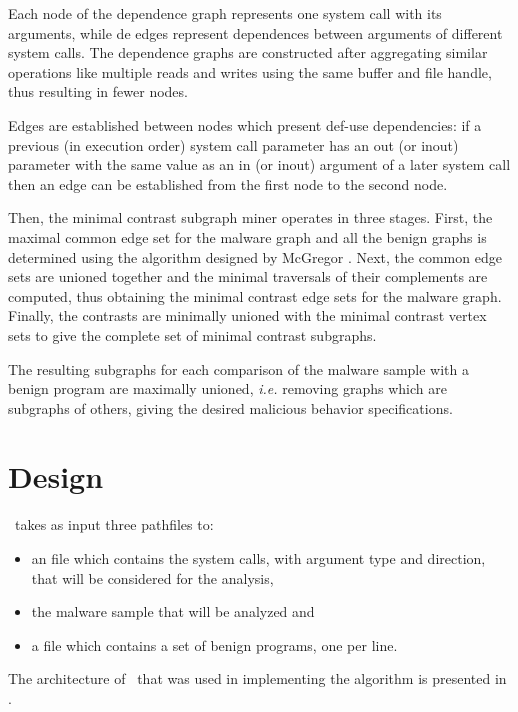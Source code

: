 
Each node of the dependence graph represents one system call with its arguments, while de edges represent dependences between arguments of different system calls. The dependence graphs are constructed after aggregating similar operations like multiple reads and writes using the same buffer and file handle, thus resulting in fewer nodes.

Edges are established between nodes which present def-use dependencies: if a previous (in execution order) system call parameter has an out (or inout) parameter with the same value as an in (or inout) argument of a later system call then an edge can be established from the first node to the second node.

Then, the minimal contrast subgraph miner operates in three stages. First, the maximal common edge set for the malware graph and all the benign graphs is determined using the algorithm designed by McGregor \cite{common-subgraph}. Next, the common edge sets are unioned together and the minimal traversals of their complements are computed, thus obtaining the minimal contrast edge sets for the malware graph. 
Finally, the contrasts are minimally unioned with the minimal contrast vertex sets to give the complete set of minimal contrast subgraphs.

The resulting subgraphs for each comparison of the malware sample with a benign program are maximally unioned, \textit{i.e.} removing graphs which are subgraphs of others, giving the desired malicious behavior specifications.

\section{Design}
\label{third:design}

\project\ takes as input three pathfiles to: 
\begin{itemize}
	\item an  file which contains the system calls, with argument type and direction, that will be considered for the analysis,
	\item the malware sample that will be analyzed and
	\item a file which contains a set of benign programs, one per line.
\end{itemize}

The architecture of \project\ that was used in implementing the algorithm is presented in .

